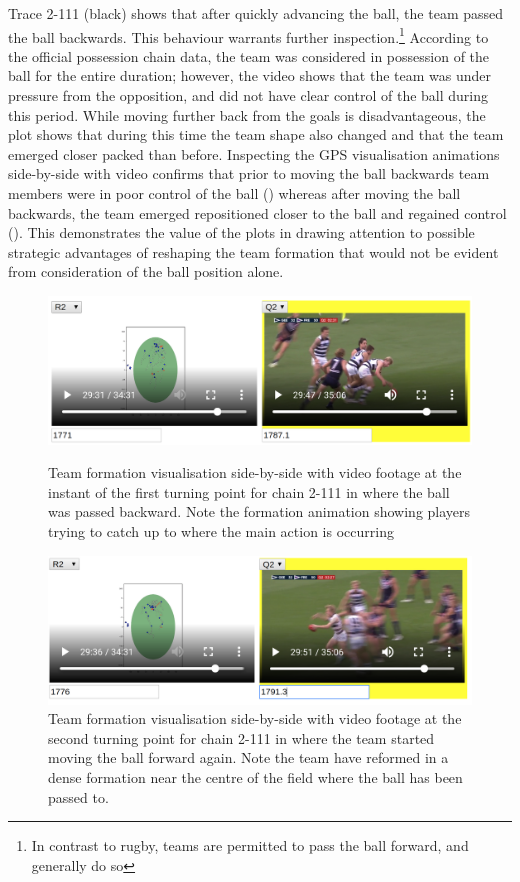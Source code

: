 Trace 2-111 (black) shows that after quickly advancing the ball, the team passed the ball backwards. This behaviour warrants further inspection.\footnote{In contrast to rugby, \afl{} teams are permitted to pass the ball forward, and generally do so} According to the official possession chain data, the team was considered in possession of the ball for the entire duration; however, the video shows that the team was under pressure from the opposition, and did not have clear control of the ball during this period. While moving further back from the goals is disadvantageous, the plot shows that during this time the team shape also changed and that the team emerged closer packed than before. Inspecting the GPS visualisation animations side-by-side with video confirms that prior to moving the ball backwards team members were in poor control of the ball () whereas after moving the ball backwards, the team emerged repositioned closer to the ball and regained control (). This demonstrates the value of the plots in drawing attention to possible strategic advantages of reshaping the team formation that would not be evident from consideration of the ball position alone.

\begin{figure}[!htbp]
\centering
\includegraphics[width=\linewidth]{figs/paper/r2-chain-111-bad-spread.png}
\caption{Team formation visualisation side-by-side with video footage at the instant of the first turning point for chain 2-111 in  where the ball was passed backward. Note the formation animation showing players trying to catch up to where the main action is occurring}
\label{fig:vid-spread-before}

\includegraphics[width=\linewidth]{figs/paper/r2-chain-111-pass-back-but-better-spread.png}
\caption{Team formation visualisation side-by-side with video footage at the second turning point for chain 2-111 in  where the team started moving the ball forward again. Note the team have reformed in a dense formation near the centre of the field where the ball has been passed to.}
\label{fig:vid-spread-after}
\end{figure}

